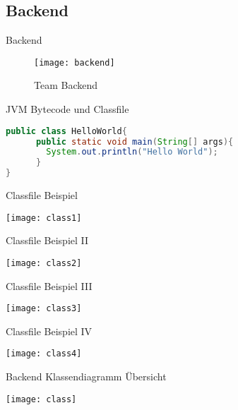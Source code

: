 \subsection{Backend}

\begin{frame}[fragile]{Backend}
	\begin{figure}
	  \begin{center}
	    \leavevmode
	      \texttt{[image: backend]}
	    \caption{Team Backend}
	  \end{center}
	\end{figure}
\end{frame}

\begin{frame}[fragile]{JVM Bytecode und Classfile}
\begin{lstlisting}[language=Java]
public class HelloWorld{
	  public static void main(String[] args){
	    System.out.println("Hello World");
	  }	
}
\end{lstlisting}
\end{frame}

\begin{frame}[fragile]{Classfile Beispiel}
\begin{center}
\texttt{[image: class1]}
\end{center}
\end{frame}

\begin{frame}[fragile]{Classfile Beispiel II}
\begin{center}
\texttt{[image: class2]}
\end{center}
\end{frame}

\begin{frame}[fragile]{Classfile Beispiel III}
\begin{center}
\texttt{[image: class3]}
\end{center}
\end{frame}

\begin{frame}[fragile]{Classfile Beispiel IV}
\begin{center}
\texttt{[image: class4]}
\end{center}
\end{frame}

\begin{frame}[fragile]{Backend Klassendiagramm Übersicht}
\begin{center}
\texttt{[image: class]}
\end{center}
\end{frame}

